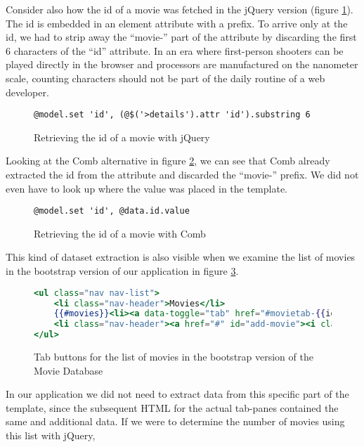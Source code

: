 \documentclass[thesis.tex]{subfiles}
\begin{document}
Consider also how the id of a movie was fetched in the jQuery version
(figure \ref{fig:jquery-fetch-substring}). The id is embedded in an element
attribute with a prefix. To arrive only at the id, we had to strip away the
``movie-'' part of the attribute by discarding the first 6 characters of the
``id'' attribute.
In an era where first-person shooters can be played directly in the browser
and processors are manufactured on the nanometer scale, counting characters
should not be part of the daily routine of a web developer.
\begin{figure}
	\centering
	\begin{lstlisting}
@model.set 'id', (@$('>details').attr 'id').substring 6
	\end{lstlisting}
	\caption{Retrieving the id of a movie with jQuery}
	\label{fig:jquery-fetch-substring}
\end{figure}
Looking at the Comb alternative in figure \ref{fig:comb-fetch-substring}, we can
see that Comb already extracted the id from the attribute and discarded the
``movie-'' prefix.
We did not even have to look up where the value was placed in the template.
\begin{figure}
	\centering
	\begin{lstlisting}
@model.set 'id', @data.id.value
	\end{lstlisting}
	\caption{Retrieving the id of a movie with Comb}
	\label{fig:comb-fetch-substring}
\end{figure}
This kind of dataset extraction is also visible when we examine the list of
movies in the bootstrap version of our application in figure
\ref{fig:movielist.mustache}.
\begin{figure}
	\centering
	\begin{lstlisting}[language=mustache]
<ul class="nav nav-list">
	<li class="nav-header">Movies</li>
	{{#movies}}<li><a data-toggle="tab" href="#movietab-{{id}}">{{title}}</a></li>{{/movies}}
	<li class="nav-header"><a href="#" id="add-movie"><i class="icon-plus"></i></a></li>
</ul>
	\end{lstlisting}
	\caption{Tab buttons for the list of movies in the bootstrap version of the Movie Database}
	\label{fig:movielist.mustache}
\end{figure}
In our application we did not need to extract data
from this specific part of the template, since the subsequent HTML for the
actual tab-panes contained the same and additional data.
If we were to determine the number of movies using this list with jQuery,
\end{document}
